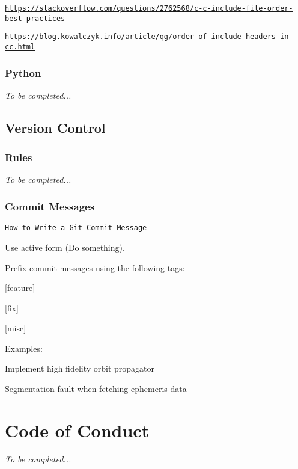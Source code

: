 \begin{DoxyItemize}
\item \href{https://stackoverflow.com/questions/2762568/c-c-include-file-order-best-practices}{\tt https\+://stackoverflow.\+com/questions/2762568/c-\/c-\/include-\/file-\/order-\/best-\/practices}
\item \href{https://blog.kowalczyk.info/article/qg/order-of-include-headers-in-cc.html}{\tt https\+://blog.\+kowalczyk.\+info/article/qg/order-\/of-\/include-\/headers-\/in-\/cc.\+html}
\end{DoxyItemize}\hypertarget{md__c_o_n_t_r_i_b_u_t_i_n_g_Python}{}\subsubsection{Python}\label{md__c_o_n_t_r_i_b_u_t_i_n_g_Python}
{\itshape To be completed...}\hypertarget{md__c_o_n_t_r_i_b_u_t_i_n_g_Version}{}\subsection{Version Control}\label{md__c_o_n_t_r_i_b_u_t_i_n_g_Version}
\hypertarget{md__c_o_n_t_r_i_b_u_t_i_n_g_Rules}{}\subsubsection{Rules}\label{md__c_o_n_t_r_i_b_u_t_i_n_g_Rules}
{\itshape To be completed...}\hypertarget{md__c_o_n_t_r_i_b_u_t_i_n_g_Commit}{}\subsubsection{Commit Messages}\label{md__c_o_n_t_r_i_b_u_t_i_n_g_Commit}
\href{https://chris.beams.io/posts/git-commit/}{\tt How to Write a Git Commit Message}

Use active form ({\ttfamily Do something}).

Prefix commit messages using the following tags\+:


\begin{DoxyItemize}
\item \mbox{[}feature\mbox{]}
\item \mbox{[}fix\mbox{]}
\item \mbox{[}misc\mbox{]}
\end{DoxyItemize}

Examples\+:


\begin{DoxyCode}
[feature] Implement high fidelity orbit propagator
\end{DoxyCode}



\begin{DoxyCode}
[fix] Segmentation fault when fetching ephemeris data
\end{DoxyCode}
\hypertarget{md__c_o_n_t_r_i_b_u_t_i_n_g_CodeOfConduct}{}\section{Code of Conduct}\label{md__c_o_n_t_r_i_b_u_t_i_n_g_CodeOfConduct}
{\itshape To be completed...} 